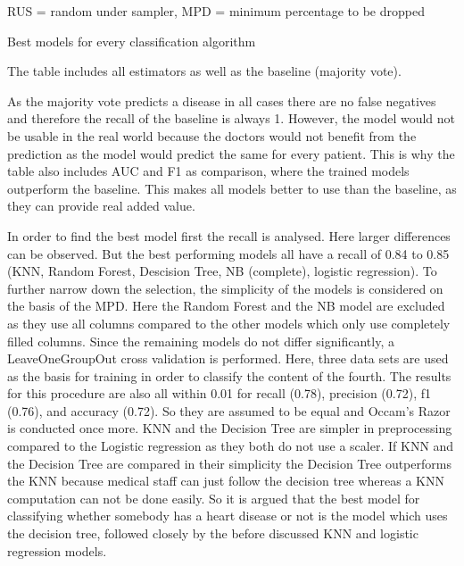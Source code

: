 \begin{table}[h]
\begin{footnotesize}
		\begin{center}
			\centering
			RUS = random under sampler, MPD = minimum percentage to be dropped
		\end{center}
	\end{footnotesize}
	\caption{Best models for every classification algorithm}
	\label{table:modelresults}

\end{table}

The table includes all estimators as well as the baseline (majority vote). 

As the majority vote predicts a disease in all cases there are no false negatives and therefore the recall of the baseline is always 1. However, the model would not be usable in the real world because the doctors would not benefit from the prediction as the model would predict the same for every patient. This is why the table also includes AUC and F1 as comparison, where the trained models outperform the baseline. This makes all models better to use than the baseline, as they can provide real added value. 

In order to find the best model first the recall is analysed. Here larger differences can be observed. But the best performing models all have a recall of 0.84 to 0.85 (KNN, Random Forest, Descision Tree, NB (complete), logistic regression).  To further narrow down the selection, the simplicity of the models is considered on the basis of the MPD. Here the Random Forest and the NB model are excluded as they use all columns compared to the other models which only use completely filled columns. Since the remaining models do not differ significantly, a LeaveOneGroupOut cross validation is performed. Here, three data sets are used as the basis for training in order to classify the content of the fourth. The results for this procedure are also all within 0.01 for recall (0.78), precision (0.72), f1 (0.76), and accuracy (0.72). So they are assumed to be equal and Occam's Razor is conducted once more. KNN and the Decision Tree are simpler in preprocessing compared to the Logistic regression as they both do not use a scaler. If KNN and the Decision Tree are compared in their simplicity the Decision Tree outperforms the KNN because medical staff can just follow the decision tree whereas a KNN computation can not be done easily. 
So it is argued that the best model for classifying whether somebody has a heart disease or not is the model which uses the decision tree, followed closely by the before discussed KNN and logistic regression models.


